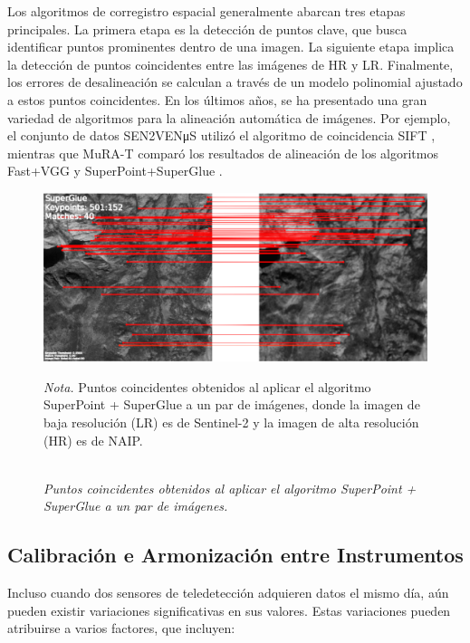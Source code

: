Los algoritmos de corregistro espacial generalmente abarcan tres etapas principales. La primera etapa es la detección de puntos clave, que busca identificar puntos prominentes dentro de una imagen. La siguiente etapa implica la detección de puntos coincidentes entre las imágenes de HR y LR. Finalmente, los errores de desalineación se calculan a través de un modelo polinomial ajustado a estos puntos coincidentes. En los últimos años, se ha presentado una gran variedad de algoritmos para la alineación automática de imágenes. Por ejemplo, el conjunto de datos SEN2VENμS utilizó el algoritmo de coincidencia SIFT \autocite{michel2022sen2venmus}, mientras que MuRA-T comparó los resultados de alineación de los algoritmos Fast+VGG y SuperPoint+SuperGlue \autocite{deshmukh2023aligned}.

\begin{figure}[H]
    \caption{\doublespacing \\ \textit{Puntos coincidentes obtenidos al aplicar el algoritmo SuperPoint + SuperGlue a un par de imágenes.}} 
    \centering
    \includegraphics[width=1\linewidth]{images/csaybar_fig01.png}
    \begin{justify}
        \textit{Nota.} Puntos coincidentes obtenidos al aplicar el algoritmo SuperPoint + SuperGlue a un par de imágenes, donde la imagen de baja resolución (LR) es de Sentinel-2 y la imagen de alta resolución (HR) es de NAIP.
    \end{justify}                    
    \label{fig:coregistration}
\end{figure}

\subsection{Calibración e Armonización entre Instrumentos}

Incluso cuando dos sensores de teledetección adquieren datos el mismo día, aún pueden existir variaciones significativas en sus valores. Estas variaciones pueden atribuirse a varios factores, que incluyen:

